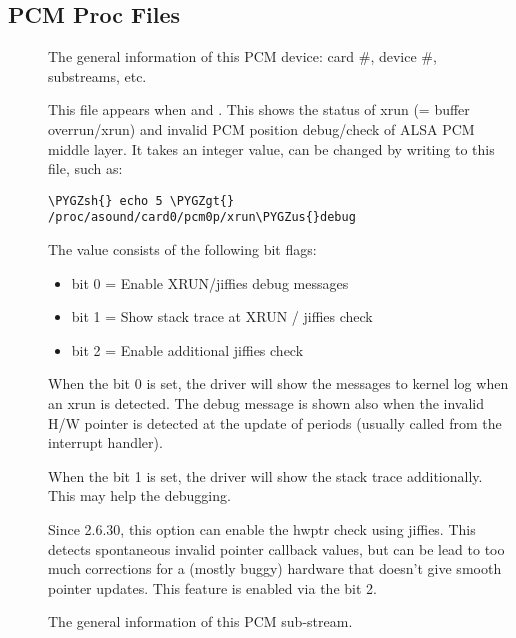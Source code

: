\documentclass[a4paper,8pt,english]{sphinxmanual}
\def\PYGZus{\char`\_}
\def\PYGZgt{\char`\>}
\def\PYGZsh{\char`\#}
\begin{document}
\subsection{PCM Proc Files}
\label{sound/designs/procfile:pcm-proc-files}\begin{description}
\item[{}] \leavevmode
The general information of this PCM device: card \#, device \#,
substreams, etc.

\item[{}] \leavevmode
This file appears when  and
.
This shows the status of xrun (= buffer overrun/xrun) and
invalid PCM position debug/check of ALSA PCM middle layer.
It takes an integer value, can be changed by writing to this
file, such as:

\begin{Verbatim}[commandchars=\\\{\}]
\PYGZsh{} echo 5 \PYGZgt{} /proc/asound/card0/pcm0p/xrun\PYGZus{}debug
\end{Verbatim}

The value consists of the following bit flags:
\begin{itemize}
\item {} 
bit 0 = Enable XRUN/jiffies debug messages

\item {} 
bit 1 = Show stack trace at XRUN / jiffies check

\item {} 
bit 2 = Enable additional jiffies check

\end{itemize}

When the bit 0 is set, the driver will show the messages to
kernel log when an xrun is detected.  The debug message is
shown also when the invalid H/W pointer is detected at the
update of periods (usually called from the interrupt
handler).

When the bit 1 is set, the driver will show the stack trace
additionally.  This may help the debugging.

Since 2.6.30, this option can enable the hwptr check using
jiffies.  This detects spontaneous invalid pointer callback
values, but can be lead to too much corrections for a (mostly
buggy) hardware that doesn't give smooth pointer updates.
This feature is enabled via the bit 2.

\item[{}] \leavevmode
The general information of this PCM sub-stream.


\end{description}
\end{document}
